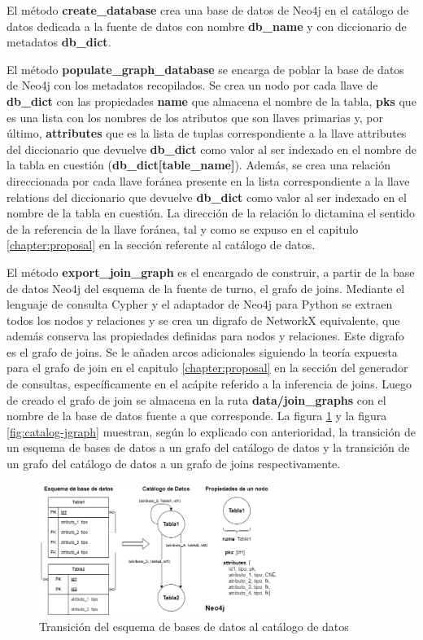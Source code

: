 El método \textbf{create\_database} crea una base de datos de Neo4j en el catálogo de datos dedicada a la 
fuente de datos con nombre \textbf{db\_name} y con diccionario de metadatos \textbf{db\_dict}. 

El método \textbf{populate\_graph\_database} se encarga de poblar la base de datos de Neo4j con los metadatos
recopilados. Se crea 
un nodo por cada llave 
de \textbf{db\_dict} con las propiedades \textbf{name} que almacena el nombre de la tabla, \textbf{pks} que es una 
lista con los nombres de los atributos que son llaves primarias y, por \'ultimo, \textbf{attributes} que 
es la lista de tuplas correspondiente a la llave attributes del diccionario que devuelve \textbf{db\_dict} como valor
al ser indexado  en el nombre de la tabla en cuestión (\textbf{db\_dict[table\_name]}). Además, se crea una relación direccionada por cada llave for\'anea 
presente en la lista correspondiente a la llave relations del diccionario que devuelve \textbf{db\_dict} 
como valor al ser indexado en el nombre de la tabla en cuestión. La dirección de la relación lo dictamina 
el sentido de la referencia de la llave 
for\'anea, tal y como se expuso en el capitulo \ref{chapter:proposal} en la sección referente al catálogo de 
datos.

El método \textbf{export\_join\_graph} es el encargado de construir, a partir de la base de datos Neo4j del esquema 
de la fuente de turno, el grafo de joins. Mediante el lenguaje de consulta Cypher y el adaptador de Neo4j para Python 
se extraen todos los nodos y relaciones y se crea un digrafo de NetworkX equivalente, que además conserva las 
propiedades definidas para nodos y relaciones. Este digrafo es el grafo de joins. Se le añaden arcos 
adicionales siguiendo la teoría expuesta para el grafo de join en el capitulo \ref{chapter:proposal} en la 
sección del generador de consultas, específicamente en el ac\'apite referido a la inferencia de joins. 
Luego 
de creado el grafo de join se almacena en la ruta \textbf{data/join\_graphs} con el nombre de la base de datos fuente 
a que corresponde. La figura \ref{fig:schema-catalog} y la figura \ref{fig:catalog-jgraph} muestran, seg\'un lo 
explicado con anterioridad, la 
transici\'on de un esquema de bases de datos a un grafo del cat\'alogo de datos y la 
transición de un grafo del cat\'alogo de datos a un grafo de joins respectivamente. 

\begin{figure}[H]
    \centering
    \includegraphics[width=0.7\textwidth]{Graphics/schema-catalog.drawio.png}
    \caption{Transición del esquema de bases de datos al cat\'alogo de datos}
    \label{fig:schema-catalog}
\end{figure}


